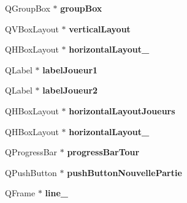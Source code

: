 \begin{DoxyCompactItemize}
\item 
\hypertarget{class_ui___main_window_aef7cb3be8cecfc9aaf98f036a98781ce}{Q\-Group\-Box $\ast$ {\bfseries group\-Box}}\label{class_ui___main_window_aef7cb3be8cecfc9aaf98f036a98781ce}

\item 
\hypertarget{class_ui___main_window_aecd96a04789fcfec3f98d80390ad8184}{Q\-V\-Box\-Layout $\ast$ {\bfseries vertical\-Layout}}\label{class_ui___main_window_aecd96a04789fcfec3f98d80390ad8184}

\item 
\hypertarget{class_ui___main_window_a80867018070156432923d0266cc9fe25}{Q\-H\-Box\-Layout $\ast$ {\bfseries horizontal\-Layout\-\_}}\label{class_ui___main_window_a80867018070156432923d0266cc9fe25}

\item 
\hypertarget{class_ui___main_window_a26cbce0e8aa487ae7eab3bdee570350a}{Q\-Label $\ast$ {\bfseries label\-Joueur1}}\label{class_ui___main_window_a26cbce0e8aa487ae7eab3bdee570350a}

\item 
\hypertarget{class_ui___main_window_a8769023d1014e31b6afe4525ebb22a3f}{Q\-Label $\ast$ {\bfseries label\-Joueur2}}\label{class_ui___main_window_a8769023d1014e31b6afe4525ebb22a3f}

\item 
\hypertarget{class_ui___main_window_a9a43633211d56018140b0d718e9fcc2e}{Q\-H\-Box\-Layout $\ast$ {\bfseries horizontal\-Layout\-Joueurs}}\label{class_ui___main_window_a9a43633211d56018140b0d718e9fcc2e}

\item 
\hypertarget{class_ui___main_window_ae183387a7d233b437a637b403ba39ffd}{Q\-H\-Box\-Layout $\ast$ {\bfseries horizontal\-Layout\-\_}}\label{class_ui___main_window_ae183387a7d233b437a637b403ba39ffd}

\item 
\hypertarget{class_ui___main_window_a5731ca480b84d22f9c8e94027e86e0c2}{Q\-Progress\-Bar $\ast$ {\bfseries progress\-Bar\-Tour}}\label{class_ui___main_window_a5731ca480b84d22f9c8e94027e86e0c2}

\item 
\hypertarget{class_ui___main_window_ad96a0a746b68d03e700e0bf4c899d389}{Q\-Push\-Button $\ast$ {\bfseries push\-Button\-Nouvelle\-Partie}}\label{class_ui___main_window_ad96a0a746b68d03e700e0bf4c899d389}

\item 
\hypertarget{class_ui___main_window_a27e0b134c3c12643afbf0b50dd175453}{Q\-Frame $\ast$ {\bfseries line\-\_}}\label{class_ui___main_window_a27e0b134c3c12643afbf0b50dd175453}


\end{DoxyCompactItemize}
